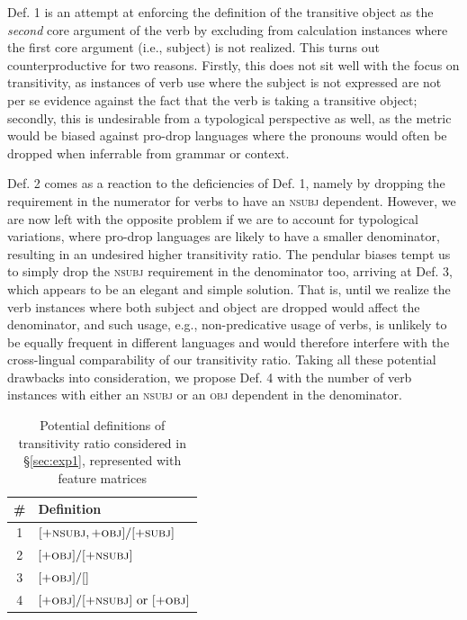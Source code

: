 Def. 1 is an attempt at enforcing the definition of the transitive object as the \textit{second} core argument of the verb by excluding from calculation instances where the first core argument (i.e., subject) is not realized. This turns out counterproductive for two reasons. Firstly, this does not sit well with the focus on transitivity, as instances of verb use where the subject is not expressed are not per se evidence against the fact that the verb is taking a transitive object; secondly, this is undesirable from a typological perspective as well, as the metric would be biased against pro-drop languages where the pronouns would often be dropped when inferrable from grammar or context. 

Def. 2 comes as a reaction to the deficiencies of Def. 1, namely by dropping the requirement in the numerator for verbs to have an \textsc{nsubj} dependent. However, we are now left with the opposite problem if we are to account for typological variations, where pro-drop languages are likely to have a smaller denominator, resulting in an undesired higher transitivity ratio. The pendular biases tempt us to simply drop the \textsc{nsubj} requirement in the denominator too, arriving at Def. 3, which appears to be an elegant and simple solution. That is, until we realize the verb instances where both subject and object are dropped would affect the denominator, and such usage, e.g., non-predicative usage of verbs, is unlikely to be equally frequent in different languages and would therefore interfere with the cross-lingual comparability of our transitivity ratio. Taking all these potential drawbacks into consideration, we propose Def. 4 with the number of verb instances with either an \textsc{nsubj} or an \textsc{obj} dependent in the denominator. 

\begin{table}[ht]
  \centering
  \begin{tabularx}{0.5\textwidth}{cX}
  {\#} & \textbf{Definition} \\
  \hline
  1&$[+\textsc{nsubj}, +\textsc{obj}]/ [+\textsc{subj}]$ \\
  2&$[+\textsc{obj}] / [+\textsc{nsubj}]$  \\
  3&$[+\textsc{obj}] / []$\\
  4&$[+\textsc{obj}] / [+\textsc{nsubj}] \text{ or } [+\textsc{obj}]$
  \end{tabularx}
  \caption{Potential definitions of transitivity ratio considered in §\ref{sec:exp1}, represented with feature matrices}\label{tab:transitivity-defs}
\end{table}

